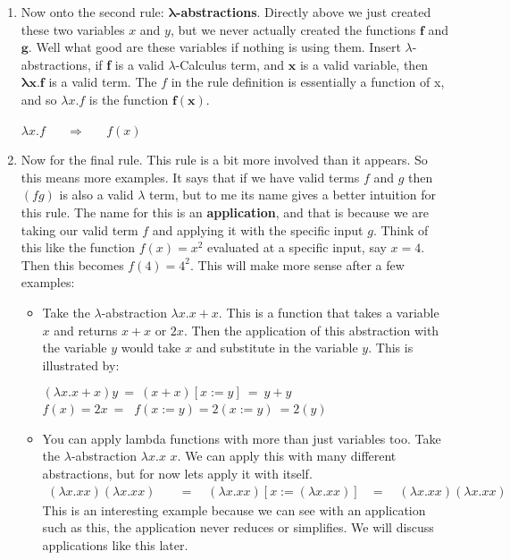 \documentclass[12pt]{article}
\begin{document}
\begin{enumerate}
\item Now onto the second rule: $\boldsymbol{\lambda}$\textbf{-abstractions}. Directly above we just created these two variables $x$ and $y$, but we never actually created the functions $\mathbf{f}$ and $\mathbf{g}$. Well what good are these variables if nothing is using them. Insert $\lambda$-abstractions, if \textbf{f} is a valid $\lambda$-Calculus term, and $\mathbf{x}$ is a valid variable, then $\boldsymbol{\lambda}\mathbf{x. f}$ is a valid term. The $f$ in the rule definition is essentially a function of x, and so $\lambda x.f$ is the function $\mathbf{f(x)}$. 
\begin{center}
$\lambda x.f$ $\quad$ $\Rightarrow$ $\quad$ $f(x)$ 
\end{center}

\item Now for the final rule. This rule is a bit more involved than it appears. So this means more examples. It says that if we have valid terms $f$ and $g$ then $(fg)$ is also a valid $\lambda$ term, but to me its name gives a better intuition for this rule. The name for this is an \textbf{application}, and that is because we are taking our valid term $f$ and applying it with the specific input $g$. Think of this like the function $f(x) = x^2$ evaluated at a specific input, say $x=4$. Then this becomes $f(4) = 4^2$. This will make more sense after a few examples:
\begin{itemize}
\item Take the $\lambda$-abstraction $\lambda x.x + x$. This is a function that takes a variable $x$ and returns $x+x$ or $2x$. Then the application of this abstraction with the variable $y$ would take $x$ and substitute in the variable $y$. This is illustrated by: 
\begin{center}
$(\lambda x.x + x)y \ = \ (x + x)[x:=y] \ = \ y + y$
\vspace{3mm}
\\$f(x) = 2x \ = \ $  $f(x:=y) = 2(x:=y) \ = 2(y)$
\end{center}
\item You can apply lambda functions with more than just variables too. Take the $\lambda$-abstraction $\lambda x.x$ $x$. We can apply this with many different abstractions, but for now lets apply it with itself. 
\begin{align*}
(\lambda x.x x) (\lambda x.x x)\quad &= \quad (\lambda x.x x) [x := (\lambda x.x x)]
&= \quad (\lambda x.x x) (\lambda x.x x)
\end{align*}
This is an interesting example because we can see with an application such as this, the application never reduces or simplifies. We will discuss applications like this later.

\end{itemize}
\end{enumerate}
\end{document}
